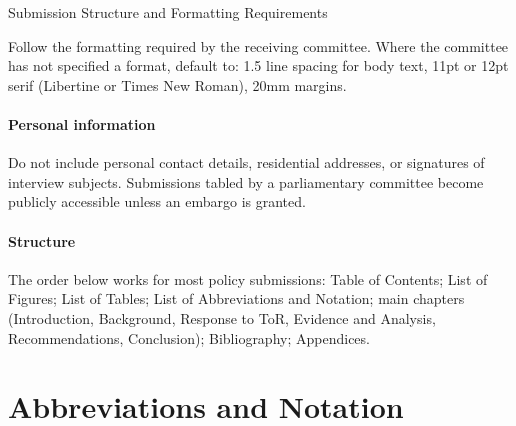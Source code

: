 \clearpage
\begin{instructional}
{\Large Submission Structure and Formatting Requirements}\par\medskip

Follow the formatting required by the receiving committee. Where the committee has not specified a format, default to: 1.5 line spacing for body text, 11pt or 12pt serif (Libertine or Times New Roman), 20mm margins.

\subsubsection{Personal information} Do not include personal contact details, residential addresses, or signatures of interview subjects. Submissions tabled by a parliamentary committee become publicly accessible unless an embargo is granted.

\subsubsection{Structure} The order below works for most policy submissions: Table of Contents; List of Figures; List of Tables; List of Abbreviations and Notation; main chapters (Introduction, Background, Response to ToR, Evidence and Analysis, Recommendations, Conclusion); Bibliography; Appendices.
\end{instructional}

\clearpage


\tableofcontents
\clearpage
\listoffigures
\clearpage
\listoftables


\chapter[Abbreviations and Notation]{Abbreviations and Notation}

